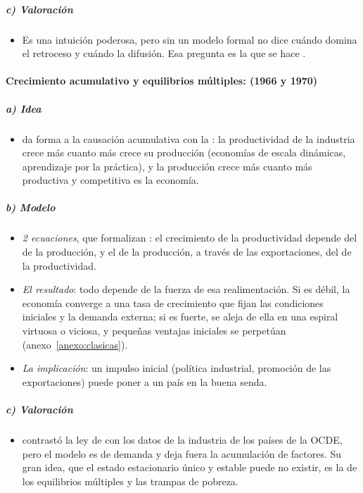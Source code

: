 \documentclass[11pt]{article}
\begin{document}
\subparagraph{c) Valoración}

\begin{itemize}
\item Es una intuición poderosa, pero sin un modelo formal no dice cuándo domina el retroceso y cuándo la difusión. Esa pregunta es la que se hace .
\end{itemize}

\paragraph{Crecimiento acumulativo y equilibrios múltiples:  (1966 y 1970)}

\subparagraph{a) Idea}

\begin{itemize}
\item \textcite{Kaldor1966,Kaldor1970} da forma a la causación acumulativa con la : la productividad de la industria crece más cuanto más crece su producción (economías de escala dinámicas, aprendizaje por la práctica), y la producción crece más cuanto más productiva y competitiva es la economía.
\end{itemize}

\subparagraph{b) Modelo}

\begin{itemize}
\item \emph{2 ecuaciones}, que formalizan \textcite{DixonThirlwall1975}: el crecimiento de la productividad depende del de la producción, y el de la producción, a través de las exportaciones, del de la productividad.
\item \emph{El resultado}: todo depende de la fuerza de esa realimentación. Si es débil, la economía converge a una tasa de crecimiento que fijan las condiciones iniciales y la demanda externa; si es fuerte, se aleja de ella en una espiral virtuosa o viciosa, y pequeñas ventajas iniciales se perpetúan (anexo~\ref{anexo:clasicas}).
\item \emph{La implicación}: un impulso inicial (política industrial, promoción de las exportaciones) puede poner a un país en la buena senda.
\end{itemize}

\subparagraph{c) Valoración}

\begin{itemize}
\item {} contrastó la ley de  con los datos de la industria de los países de la OCDE, pero el modelo es de demanda y deja fuera la acumulación de factores. Su gran idea, que el estado estacionario único y estable puede no existir, es la de los equilibrios múltiples y las trampas de pobreza.
\end{itemize}
\end{document}
